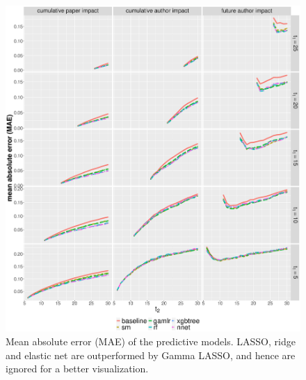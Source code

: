 \begin{refsection}
\begin{figure}[ht!]
    \centering
    \includegraphics[width=\textwidth]{figures/pred_model/mae_diff.eps}
    \caption{Mean absolute error (MAE) of the predictive models. LASSO, ridge and elastic net are outperformed by Gamma LASSO, and hence are ignored for a better visualization.}
    \label{fig:pred_mae}
\end{figure}


\end{refsection}
